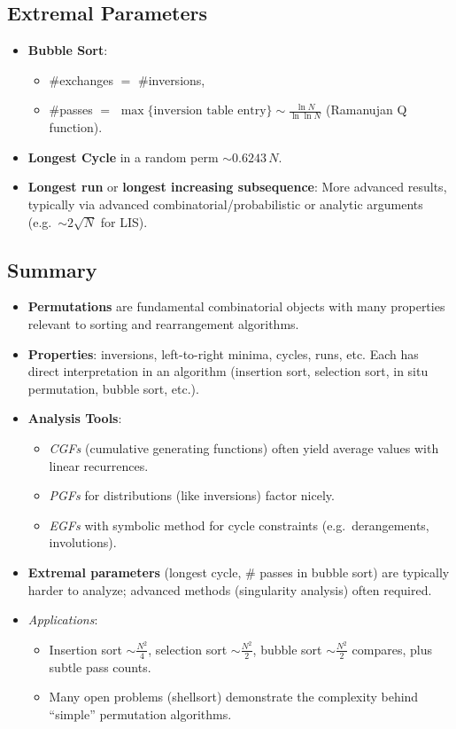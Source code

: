 \documentclass[11pt,letterpaper]{article}
\begin{document}
\subsection{Extremal Parameters}
\begin{itemize}
  \item \textbf{Bubble Sort}:
    \begin{itemize}
      \item \#exchanges $=$ \#inversions,
      \item \#passes $=$ $\max\{\text{inversion table entry}\} \sim \frac{\ln N}{\ln\ln N}$ (Ramanujan Q function). 
    \end{itemize}
  \item \textbf{Longest Cycle} in a random perm $\sim 0.6243\,N$. 
  \item \textbf{Longest run} or \textbf{longest increasing subsequence}: More advanced results, typically via advanced combinatorial/probabilistic or analytic arguments (e.g.\ $\sim 2\sqrt{N}$ for LIS).
\end{itemize}

\subsection{Summary}
\begin{itemize}
  \item \textbf{Permutations} are fundamental combinatorial objects with many properties relevant to sorting and rearrangement algorithms.
  \item \textbf{Properties}: inversions, left-to-right minima, cycles, runs, etc. Each has direct interpretation in an algorithm (insertion sort, selection sort, in situ permutation, bubble sort, etc.).
  \item \textbf{Analysis Tools}: 
    \begin{itemize}
      \item \emph{CGFs} (cumulative generating functions) often yield average values with linear recurrences.
      \item \emph{PGFs} for distributions (like inversions) factor nicely.
      \item \emph{EGFs} with symbolic method for cycle constraints (e.g.\ derangements, involutions).
    \end{itemize}
  \item \textbf{Extremal parameters} (longest cycle, \# passes in bubble sort) are typically harder to analyze; advanced methods (singularity analysis) often required.
  \item \emph{Applications}:
    \begin{itemize}
      \item Insertion sort $\sim \frac{N^2}{4}$, selection sort $\sim \frac{N^2}{2}$, bubble sort $\sim \frac{N^2}{2}$ compares, plus subtle pass counts.
      \item Many open problems (shellsort) demonstrate the complexity behind “simple” permutation algorithms.
    \end{itemize}
\end{itemize}
\clearpage
\end{document}

